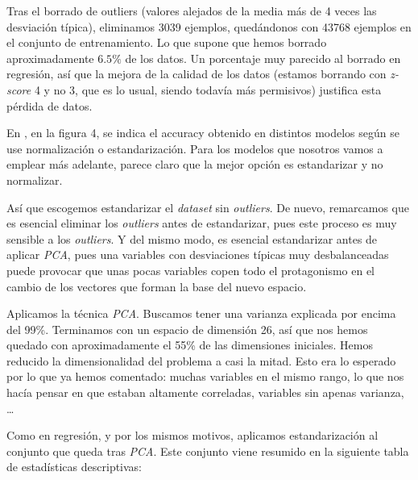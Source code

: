 \documentclass[11pt]{article}
\begin{document}
Tras el borrado de outliers (valores alejados de la media más de 4 veces las desviación típica), eliminamos 3039 ejemplos, quedándonos con 43768 ejemplos en el conjunto de entrenamiento. Lo que supone que hemos borrado aproximadamente $6.5\%$ de los datos. Un porcentaje muy parecido al borrado en regresión, así que la mejora de la calidad de los datos (estamos borrando con \emph{z-score} 4 y no 3, que es lo usual, siendo todavía más permisivos) justifica esta pérdida de datos.

En \cite{paper_clasificacion_1:paper}, en la figura 4, se indica el accuracy obtenido en distintos modelos según se use normalización o estandarización. Para los modelos que nosotros vamos a emplear más adelante, parece claro que la mejor opción es estandarizar y no normalizar.

Así que escogemos estandarizar el \emph{dataset} sin \emph{outliers}. De nuevo, remarcamos que es esencial eliminar los \emph{outliers} antes de estandarizar, pues este proceso es muy sensible a los \emph{outliers}. Y del mismo modo, es esencial estandarizar antes de aplicar \emph{PCA}, pues una variables con desviaciones típicas muy desbalanceadas puede provocar que unas pocas variables copen todo el protagonismo en el cambio de los vectores que forman la base del nuevo espacio.

Aplicamos la técnica \emph{PCA}. Buscamos tener una varianza explicada por encima del 99\%. Terminamos con un espacio de dimensión 26, así que nos hemos quedado con aproximadamente el 55\% de las dimensiones iniciales. Hemos reducido la dimensionalidad del problema a casi la mitad. Esto era lo esperado por lo que ya hemos comentado: muchas variables en el mismo rango, lo que nos hacía pensar en que estaban altamente correladas, variables sin apenas varianza, \ldots

Como en regresión, y por los mismos motivos, aplicamos estandarización al conjunto que queda tras \emph{PCA}. Este conjunto viene resumido en la siguiente tabla de estadísticas descriptivas:
\end{document}
